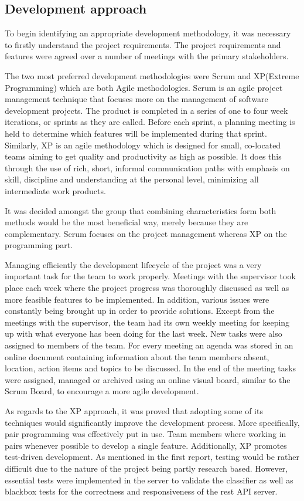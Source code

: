\subsection{Development approach} 
To begin identifying an appropriate development methodology, it was necessary to firstly understand 
the project requirements. The project requirements and features were agreed over a number of 
meetings with the primary stakeholders.

The two most preferred development methodologies were 
Scrum and XP(Extreme Programming) which are both Agile methodologies. Scrum is an agile project management technique that focuses more 
on the management of software development projects. The product is completed in a series of one to 
four week iterations, or sprints as they are called. Before each sprint, a planning meeting is held 
to determine which features will be implemented during that sprint. Similarly, XP is an agile 
methodology which is designed for small, co-located teams aiming to get quality and productivity as 
high as possible. It does this through the use of rich, short, informal communication paths with 
emphasis on skill, discipline and understanding at the personal level, minimizing all intermediate 
work products. 

It was decided amongst the group that combining characteristics form both methods 
would be the most beneficial way, merely because they are complementary. Scrum focuses on the project management 
whereas XP on the programming part.

Managing efficiently the development lifecycle of the project was a very 
important task for the team to work properly. Meetings with the supervisor took place each week 
where the project progress was thoroughly discussed as well as more feasible features to be 
implemented. In addition, various issues were constantly being brought up in order to provide solutions. Except from 
the meetings with the supervisor, the team had its own weekly meeting for keeping up with what 
everyone has been doing for the last week. New tasks were also assigned to members of the team. For 
every meeting an agenda was stored in an online document containing information about the team 
members absent, location, action items and topics to be discussed. In the end of the meeting tasks 
were assigned, managed or archived using an online visual board, similar to the Scrum Board, to 
encourage a more agile development.

As regards to the XP approach, it was proved that adopting 
some of its techniques would significantly improve the development process. More specifically, pair 
programming was effectively put in use. Team members where working in pairs whenever possible to 
develop a single feature. Additionally, XP promotes test-driven development. As mentioned in the 
first report, testing would be rather difficult due to the nature of the project being partly 
research based. However, essential tests were implemented in the server to validate the classifier 
as well as blackbox tests for the correctness and responsiveness of the rest API server. 

